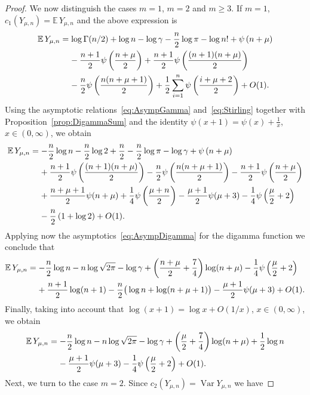 \documentclass[AHL,Unicode,longabstracts,published]{cedram}
\newcommand{\EE}{\mathbb{E}\,}
\newcommand{\Var}{\mathop{\mathrm{Var}}\nolimits}
\begin{document}
\begin{proof}
We now distinguish the cases $m=1$, $m=2$ and $m\geq 3$. If $m=1$, $c_1(Y_{\mu,n})=\EE Y_{\mu,n}$ and the above expression is
\begin{align*}
\EE Y_{\mu,n}&=\log \Gamma(n/2)+\log n-\log\gamma-\frac{n}{2}\log\pi-\log n!+\psi\left(n+\mu\right)\\
&\mkern20mu -\frac{n+1}{2}\psi\left(\frac{n+\mu}{2}\right)+\frac{n+1}{2}\psi\left(\frac{(n+1)(n+\mu)}{2}\right)\\
&\mkern20mu -\frac{n}{2}\psi\left(\frac{n(n+\mu+1)}{2}\right)+\frac12\sum\limits_{i=1}^{n}\psi\left(\frac{i+\mu+2}{2}\right)+O(1).
\end{align*}
Using the asymptotic relations~\eqref{eq:AsympGamma} and~\eqref{eq:Stirling} together with Proposition~\ref{prop:DigammaSum} and the identity $\psi(x+1)=\psi(x)+\frac{1}{x}$, $x\in(0,\infty)$, we obtain
\begin{align*}
\EE Y_{\mu,n}&=-\frac{n}{2}\log n-\frac{n}{2}\log 2+\frac{n}{2}-\frac{n}{2}\log\pi-\log\gamma+\psi\left(n+\mu\right)\\
&\mkern20mu +\frac{n+1}{2}\psi\left(\frac{(n+1)(n+\mu)}{2}\right)-\frac{n}{2}\psi\left(\frac{n(n+\mu+1)}{2}\right)-\frac{n+1}{2}\psi\left(\frac{n+\mu}{2}\right)\\
&\mkern20mu + \frac{n+\mu+1}{2}\psi (n+\mu)+\frac{1}{4}\psi\left(\frac{\mu+n}{2}\right)-\frac{\mu+1}{2}\psi(\mu+3)-\frac{1}{4}\psi\left(\frac{\mu}{2}+2\right)\\
&\mkern20mu -\frac{n}{2}\left(1+\log 2\right) +O(1).
\end{align*}
Applying now the asymptotics~\eqref{eq:AsympDigamma} for the digamma function we conclude that
\begin{align*}
\EE Y_{\mu,n}&=-\frac{n}{2}\log n-n\log\sqrt{2\pi}-\log\gamma +\left(\frac{n+\mu}{2}+\frac{7}{4}\right)\log(n+\mu)-\frac{1}{4}\psi\left(\frac{\mu}{2}+2\right)\\
&\mkern20mu+\frac{n+1}{2}\log(n+1)-\frac{n}{2}\big(\log n+\log(n+\mu+1)\big)-\frac{\mu+1}{2}\psi(\mu+3)+O(1).
\end{align*}
Finally, taking into account that $\log (x+1)=\log x+O(1/x)$, $x\in(0,\infty)$, we obtain
\begin{align*}
\EE Y_{\mu,n}&=-\frac{n}{2}\log n-n\log\sqrt{2\pi}-\log\gamma +\left(\frac{\mu}{2}+\frac{7}{4}\right)\log(n+\mu)+\frac{1}{2}\log n\\
&\mkern20mu-\frac{\mu+1}{2}\psi(\mu+3)-\frac{1}{4}\psi\left(\frac{\mu}{2}+2\right)+O(1).
\end{align*}
Next, we turn to the case $m=2$. Since $c_2(Y_{\mu, n})=\Var Y_{\mu,n}$ we have

\end{proof}
\end{document}
